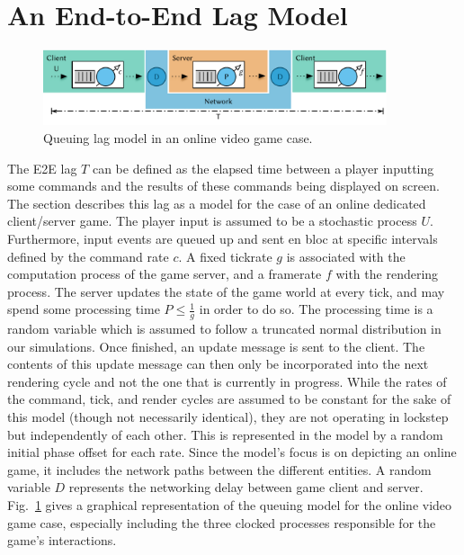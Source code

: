 \section{An End-to-End Lag Model}
\label{sec:model}

\begin{figure}[!t]
	\centering
	\includegraphics[width=0.9\textwidth]{../../../models/e2e-lag-model.pdf}
	\caption{Queuing lag model in an online video game case.}
\label{fig:queuing-model}
\end{figure}

The \gls{E2E} lag $T$ can be defined as the elapsed time between a player inputting some commands and the results of these commands being displayed on screen. The section describes this lag as a model for the case of an online dedicated client/server game. The player input is assumed to be a stochastic process $U$. Furthermore, input events are queued up and sent en bloc at specific intervals defined by the command rate $c$. A fixed tickrate $g$ is associated with the computation process of the game server, and a framerate $f$ with the rendering process. The server updates the state of the game world at every tick, and may spend some processing time $P \leq \frac{1}{g}$ in order to do so. The processing time is a random variable which is assumed to follow a truncated normal distribution in our simulations. Once finished, an update message is sent to the client. The contents of this update message can then only be incorporated into the next rendering cycle and not the one that is currently in progress. While the rates of the command, tick, and render cycles are assumed to be constant for the sake of this model (though not necessarily identical), they are not operating in lockstep but independently of each other. This is represented in the model by a random initial phase offset for each rate. Since the model's focus is on depicting an online game, it includes the network paths between the different entities. A random variable $D$ represents the networking delay between game client and server. Fig.~\ref{fig:queuing-model} gives a graphical representation of the queuing model for the online video game case, especially including the three clocked processes responsible for the game's interactions.

